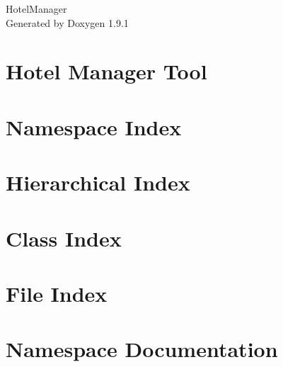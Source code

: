 \let\mypdfximage\pdfximage\def\pdfximage{\immediate\mypdfximage}\documentclass[twoside]{book}
\newcommand{\+}{\discretionary{\mbox{\scriptsize$\hookleftarrow$}}{}{}}
\newcommand{\clearemptydoublepage}{%
  \newpage{\pagestyle{empty}\cleardoublepage}%
}
\begin{document}
\raggedbottom

\hypersetup{pageanchor=false,
             bookmarksnumbered=true,
             pdfencoding=unicode
            }
\begin{titlepage}
\vspace*{7cm}
\begin{center}%
{\Large Hotel\+Manager }\\
\vspace*{1cm}
{\large Generated by Doxygen 1.9.1}\\
\end{center}
\end{titlepage}
\clearemptydoublepage
{}
\tableofcontents
\clearemptydoublepage
{}
\hypersetup{pageanchor=true}

\chapter{Hotel Manager Tool}
\label{md_README}

\chapter{Namespace Index}

\chapter{Hierarchical Index}

\chapter{Class Index}

\chapter{File Index}

\chapter{Namespace Documentation}










\end{document}
